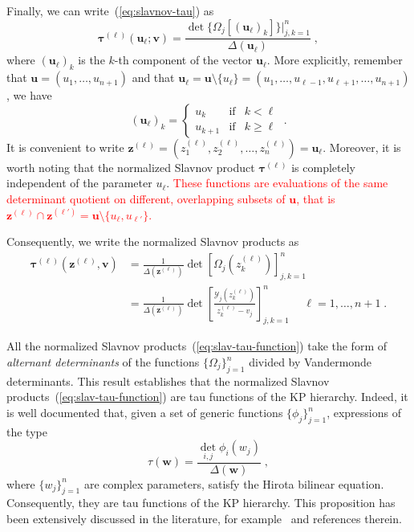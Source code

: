 \documentclass[a4paper,11pt]{amsart}
\begin{document}
Finally, we can write~(\ref{eq:slavnov-tau}) as 
\begin{equation}
\label{eq:slavnov-tau-functions}
  \bm{\tau}^{(\ell)}(\bm{u}_\ell; \bm{v}) = \frac{\det \{\Omega_j[(\bm{u}_\ell)_k]\}|_{j,k=1}^n }{\Delta(\bm{u}_\ell)} \; ,
\end{equation}
where \((\bm{u}_\ell)_k \) is the \(k\)-th component of the vector
\(\bm{u}_\ell\).  More explicitly, remember that \(\bm{u} = (u_1,
\dots, u_{n+1})\) and that \(\bm{u}_\ell = \bm{u}\setminus
\{u_\ell\} = (u_1, \dots, u_{\ell-1}, u_{\ell+ 1}, \dots, u_{n+1})\),
we have
\begin{equation}
  (\bm{u}_\ell)_k =
  \left\{ 
  \begin{matrix}
    u_k & \text{if} & k < \ell\\
    u_{k+1} & \text{if} & k \geq \ell
  \end{matrix}
  \right. \; .
\end{equation}
It is convenient to write \(\bm{z}^{(\ell)} = (z^{(\ell)}_1, z^{(\ell)}_2, \dots, z^{(\ell)}_n) =
\bm{u}_{\ell}\). Moreover, it is worth noting that the normalized Slavnov product
\(\bm{\tau}^{(\ell)}\) is completely independent of the parameter \(u_\ell\). \textcolor{red}{These functions are
evaluations of the same determinant quotient on different, overlapping subsets of \(\bm{u}\), that is
\(\bm{z}^{(\ell)} \cap \bm{z}^{(\ell')} = \bm{u} \setminus
\{ u_\ell, u_{\ell'}\} \).}

Consequently, we write the normalized Slavnov products as 
\begin{equation}
\begin{split}
\label{eq:slav-tau-function}
  \bm{\tau}^{(\ell)}(\bm{z}^{(\ell)}, \bm{v})
  & = \frac{1}{\Delta(\bm{z^{(\ell)}})} \det[\Omega_j(z^{(\ell)}_k) ]_{j,k=1}^n \\
  & = \frac{1}{\Delta(\bm{z}^{(\ell)})} \det\left[\frac{\mathcal{Y}_j(z^{(\ell)}_k)}{z^{(\ell)}_k - v_j} \right]_{j,k=1}^n
  \; \quad \ell = 1, \dots, n+1 \; .
\end{split}
\end{equation}

All the normalized Slavnov products~(\ref{eq:slav-tau-function}) take
the form of \emph{alternant determinants} of the functions
\(\{\Omega_j\}_{j=1}^n\) divided by Vandermonde determinants.  This
result establishes that the normalized Slavnov
products~(\ref{eq:slav-tau-function}) are tau functions of the KP
hierarchy.  Indeed, it is well documented that, given a set of generic
functions \(\{\phi_j\}_{j=1}^n\), expressions of the type
\begin{equation}
\tau(\bm{w}) =
\frac{\det_{i,j} \phi_i(w_j)}{\Delta(\bm{w})}\; ,
\end{equation}
where \(\{w_j\}_{j=1}^n\) are complex parameters, satisfy the Hirota
bilinear equation. Consequently, they are tau functions of the KP
hierarchy.  This proposition has been extensively discussed in the
literature, for example~\cite{Segal:1985aga, Kharchev:1991cy,
  Araujo:2021ghu} and references therein.
\end{document}
